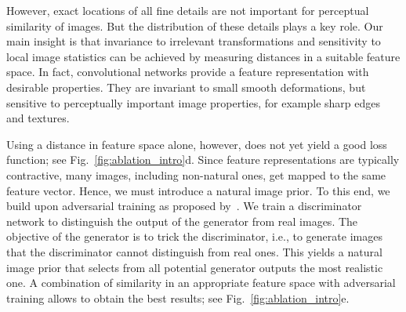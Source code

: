 \documentclass{article}
\newcommand{\TODO}[1]{{\color{dblue}[TODO #1]}}
\newcommand{\tcb}[1]{\textcolor{red}{#1}}    %
\newcommand{\tca}[1]{\textcolor{alexey}{#1}}    %
\begin{document}
However, exact locations of all fine details are not important for perceptual similarity of images.
But the distribution of these details plays a key role. 
Our main insight is that invariance to irrelevant transformations and sensitivity to local image statistics can be achieved by measuring distances in a suitable feature space. 
In fact, convolutional networks provide a feature representation with desirable properties.
They are invariant to small smooth deformations, but sensitive to perceptually important image properties, for example sharp edges and textures.

Using a distance in feature space alone, however, does not yet yield a good loss function; see Fig.~\ref{fig:ablation_intro}d.
Since feature representations are typically contractive, many images, including non-natural ones, get mapped to the same feature vector.
Hence, we must introduce a natural image prior.
To this end, we build upon adversarial training as proposed by~\citet{Goodfellow_NIPS2014}.
We train a discriminator network to distinguish the output of the generator from real images.
The objective of the generator is to trick the discriminator, i.e., to generate images that the discriminator cannot distinguish from real ones. 
This yields a natural image prior that selects from all potential generator outputs the most realistic one. 
A combination of similarity in an appropriate feature space with adversarial training allows to obtain the best results; see Fig.~\ref{fig:ablation_intro}e.

\end{document}
